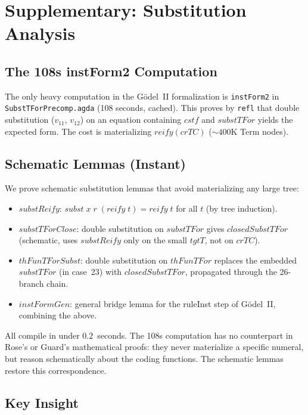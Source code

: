 \documentclass[11pt]{article}
\begin{document}
\section{Supplementary: Substitution Analysis}

\subsection{The 108s instForm2 Computation}

The only heavy computation in the G\"odel~II formalization is
\texttt{instForm2} in \texttt{SubstTForPrecomp.agda} (108 seconds,
cached). This proves by \texttt{refl} that double substitution
($v_{11}$, $v_{12}$) on an equation containing $\mathit{cstf}$ and
$\mathit{substTFor}$ yields the expected form. The cost is
materializing $\mathit{reify}(\mathit{crTC})$ (${\sim}400$K Term nodes).

\subsection{Schematic Lemmas (Instant)}

We prove schematic substitution lemmas that avoid materializing any
large tree:

\begin{itemize}
\item $\mathit{substReify}$: $\mathit{subst}\;x\;r\;(\mathit{reify}\;t)
  = \mathit{reify}\;t$ for all $t$ (by tree induction).
\item $\mathit{substTForClose}$: double substitution on $\mathit{substTFor}$
  gives $\mathit{closedSubstTFor}$ (schematic, uses $\mathit{substReify}$
  only on the small $\mathit{tgtT}$, not on $\mathit{crTC}$).
\item $\mathit{thFunTForSubst}$: double substitution on $\mathit{thFunTFor}$
  replaces the embedded $\mathit{substTFor}$ (in case~23) with
  $\mathit{closedSubstTFor}$, propagated through the 26-branch chain.
\item $\mathit{instFormGen}$: general bridge lemma for the ruleInst step
  of G\"odel~II, combining the above.
\end{itemize}

All compile in under $0.2$~seconds. The 108s computation has no
counterpart in Rose's or Guard's mathematical proofs: they never
materialize a specific numeral, but reason schematically about the
coding functions. The schematic lemmas restore this correspondence.

\subsection{Key Insight}
\end{document}
